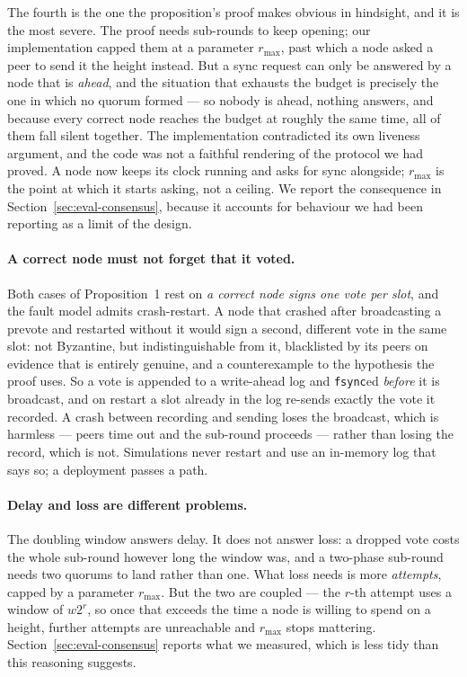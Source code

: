 \documentclass{llncs}
\begin{document}
The fourth is the one the proposition's proof makes obvious in hindsight, and it
is the most severe. The proof needs sub-rounds to keep opening; our
implementation capped them at a parameter $r_{\max}$, past which a node asked a
peer to send it the height instead. But a sync request can only be answered by a
node that is \emph{ahead}, and the situation that exhausts the budget is
precisely the one in which no quorum formed --- so nobody is ahead, nothing
answers, and because every correct node reaches the budget at roughly the same
time, all of them fall silent together. The implementation contradicted its own
liveness argument, and the code was not a faithful rendering of the protocol we
had proved. A node now keeps its clock running and asks for sync alongside;
$r_{\max}$ is the point at which it starts asking, not a ceiling. We report the
consequence in Section~\ref{sec:eval-consensus}, because it accounts for
behaviour we had been reporting as a limit of the design.

\paragraph{A correct node must not forget that it voted.}
Both cases of Proposition~1 rest on \emph{a correct node signs one vote per
slot}, and the fault model admits crash-restart. A node that crashed after
broadcasting a prevote and restarted without it would sign a second, different
vote in the same slot: not Byzantine, but indistinguishable from it, blacklisted
by its peers on evidence that is entirely genuine, and a counterexample to the
hypothesis the proof uses. So a vote is appended to a write-ahead log and
\texttt{fsync}ed \emph{before} it is broadcast, and on restart a slot already in
the log re-sends exactly the vote it recorded. A crash between recording and
sending loses the broadcast, which is harmless --- peers time out and the
sub-round proceeds --- rather than losing the record, which is not. Simulations
never restart and use an in-memory log that says so; a deployment passes a path.

\paragraph{Delay and loss are different problems.}
The doubling window answers delay. It does not answer loss: a dropped vote costs
the whole sub-round however long the window was, and a two-phase sub-round needs
two quorums to land rather than one. What loss needs is more \emph{attempts},
capped by a parameter $r_{\max}$. But the two are coupled --- the $r$-th attempt
uses a window of $w 2^{r}$, so once that exceeds the time a node is willing to
spend on a height, further attempts are unreachable and $r_{\max}$ stops
mattering. Section~\ref{sec:eval-consensus} reports what we measured, which is
less tidy than this reasoning suggests.
\end{document}
